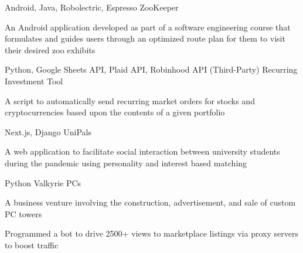 




\begin{cventries}

  \cventry
    {Android, Java, Robolectric, Espresso} %
    {ZooKeeper} %
    {} %
    {} %
    {\begin{cvitems}
         \item {An Android application developed as part of a software engineering course that formulates and guides users through an optimized route plan for them to visit their desired zoo exhibits}
    \end{cvitems}
    }
    
  \cventry
    { {Python, Google Sheets API, Plaid API, Robinhood API (Third-Party)}}
    {Recurring Investment Tool} %
    {} %
    {} %
    {\begin{cvitems}
        \item {A script to automatically send recurring market orders for stocks and cryptocurrencies based upon the contents of a given portfolio}
    \end{cvitems}} %
    
  \cventry
    {Next.js, Django} %
    {UniPals} %
    {} %
    {} %
     {\begin{cvitems}
        \item {A web application to facilitate social interaction between university students during the pandemic using personality and interest based matching}
    \end{cvitems}
    }

  \cventry
    {Python} %
    {Valkyrie PCs} %
    {} %
    {} %
     {\begin{cvitems}
        \item {A business venture involving the construction, advertisement, and sale of custom PC towers}
        \item {Programmed a bot to drive 2500+ views to marketplace listings via proxy servers to boost traffic}
    \end{cvitems}
    }
    

\end{cventries}